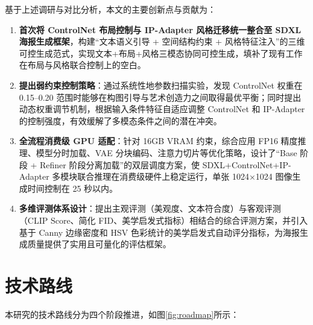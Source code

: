 \documentclass[10pt,a4paper]{article}
\begin{document}
基于上述调研与对比分析，本文的主要创新点与贡献为：

\begin{enumerate}[itemsep=4pt,topsep=4pt]
    \item \textbf{首次将 ControlNet 布局控制与 IP-Adapter 风格迁移统一整合至 SDXL 海报生成框架}，构建``文本语义引导 + 空间结构约束 + 风格特征注入''的三维可控生成范式，实现文本+布局+风格三模态协同可控生成，填补了现有工作在布局与风格联合控制上的空白。

    \item \textbf{提出弱约束控制策略}：通过系统性地参数扫描实验，发现 ControlNet 权重在 0.15--0.20 范围时能够在构图引导与艺术创造力之间取得最优平衡；同时提出动态权重调节机制，根据输入条件特征自适应调整 ControlNet 和 IP-Adapter 的控制强度，有效缓解了多模态条件之间的潜在冲突。

    \item \textbf{全流程消费级 GPU 适配}：针对 16GB VRAM 约束，综合应用 FP16 精度推理、模型分时加载、VAE 分块编码、注意力切片等优化策略，设计了``Base 阶段 + Refiner 阶段分离加载''的双层调度方案，使 SDXL+ControlNet+IP-Adapter 多模块联合推理在消费级硬件上稳定运行，单张 1024×1024 图像生成时间控制在 25 秒以内。

    \item \textbf{多维评测体系设计}：提出主观评测（美观度、文本符合度）与客观评测（CLIP Score、简化 FID、美学启发式指标）相结合的综合评测方案，并引入基于 Canny 边缘密度和 HSV 色彩统计的美学启发式自动评分指标，为海报生成质量提供了实用且可量化的评估框架。
\end{enumerate}

\section{技术路线}

本研究的技术路线分为四个阶段推进，如图\ref{fig:roadmap}所示：
\end{document}

